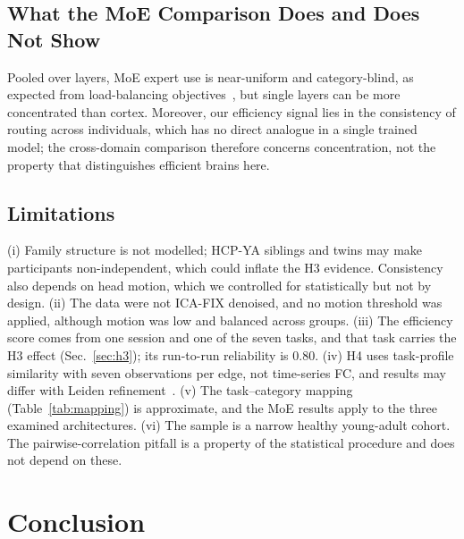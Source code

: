 \documentclass[conference]{IEEEtran}
\begin{document}
\subsection{What the MoE Comparison Does and Does Not Show}

Pooled over layers, MoE expert use is near-uniform and category-blind, as expected from load-balancing objectives~\cite{fedus2022switch}, but single layers can be more concentrated than cortex. Moreover, our efficiency signal lies in the consistency of routing across individuals, which has no direct analogue in a single trained model; the cross-domain comparison therefore concerns concentration, not the property that distinguishes efficient brains here.

\subsection{Limitations}\label{sec:limits}

(i) Family structure is not modelled; HCP-YA siblings and twins may make participants non-independent, which could inflate the H3 evidence. Consistency also depends on head motion, which we controlled for statistically but not by design. (ii) The data were not ICA-FIX denoised, and no motion threshold was applied, although motion was low and balanced across groups. (iii) The efficiency score comes from one session and one of the seven tasks, and that task carries the H3 effect (Sec.~\ref{sec:h3}); its run-to-run reliability is $0.80$. (iv) H4 uses task-profile similarity with seven observations per edge, not time-series FC, and results may differ with Leiden refinement~\cite{traag2019louvain}. (v) The task--category mapping (Table~\ref{tab:mapping}) is approximate, and the MoE results apply to the three examined architectures. (vi) The sample is a narrow healthy young-adult cohort. The pairwise-correlation pitfall is a property of the statistical procedure and does not depend on these.

\section{Conclusion}
\end{document}
